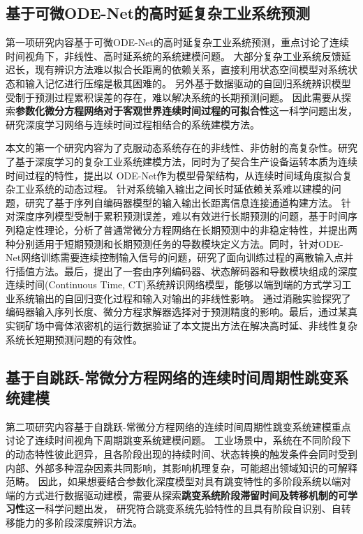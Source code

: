 \subsection{基于可微ODE-Net的高时延复杂工业系统预测}
第一项研究内容基于可微ODE-Net的高时延复杂工业系统预测，重点讨论了连续时间视角下，非线性、高时延系统的系统建模问题。
大部分复杂工业系统反馈延迟长，现有辨识方法难以拟合长距离的依赖关系，直接利用状态空间模型对系统状态和输入记忆进行压缩是极其困难的。
另外基于数据驱动的自回归系统辨识模型受制于预测过程累积误差的存在，难以解决系统的长期预测问题。
因此需要从探索\textbf{参数化微分方程网络对于客观世界连续时间过程的可拟合性}这一科学问题出发，研究深度学习网络与连续时间过程相结合的系统建模方法。

本文的第一个研究内容为了克服动态系统存在的非线性、非仿射的高复杂性。研究了基于深度学习的复杂工业系统建模方法，同时为了契合生产设备运转本质为连续时间过程的特性，提出以
ODE-Net作为模型骨架结构，从连续时间域角度拟合复杂工业系统的动态过程。
针对系统输入输出之间长时延依赖关系难以建模的问题，研究了基于序列自编码器模型的输入输出长距离信息连接通道构建方法。
针对深度序列模型受制于累积预测误差，难以有效进行长期预测的问题，基于时间序列稳定性理论，分析了普通常微分方程网络在长期预测中的非稳定特性，并提出两种分别适用于短期预测和长期预测任务的导数模块定义方法。同时，针对ODE-Net网络训练需要连续控制输入信号的问题，研究了面向训练过程的离散输入点并行插值方法。最后，提出了一套由序列编码器、状态解码器和导数模块组成的深度连续时间(Continuous Time, CT)系统辨识网络模型，能够以端到端的方式学习工业系统输出的自回归变化过程和输入对输出的非线性影响。
通过消融实验探究了编码器输入序列长度、微分方程求解器选择对于预测精度的影响。最后，通过某真实铜矿场中膏体浓密机的运行数据验证了本文提出方法在解决高时延、非线性复杂系统长短期预测问题的有效性。




\subsection{基于自跳跃-常微分方程网络的连续时间周期性跳变系统建模}


第二项研究内容基于自跳跃-常微分方程网络的连续时间周期性跳变系统建模重点讨论了连续时间视角下周期跳变系统建模问题。
工业场景中，系统在不同阶段下的动态特性彼此迥异，且各阶段出现的持续时间、状态转换的触发条件会同时受到内部、外部多种混杂因素共同影响，其影响机理复杂，可能超出领域知识的可解释范畴。
因此，如果想要结合参数化深度模型对具有跳变特性的多阶段系统以端对端的方式进行数据驱动建模，需要从探索\textbf{跳变系统阶段滞留时间及转移机制的可学习性}这一科学问题出发，
研究符合跳变系统先验特性的且具有阶段自识别、自转移能力的多阶段深度辨识方法。

